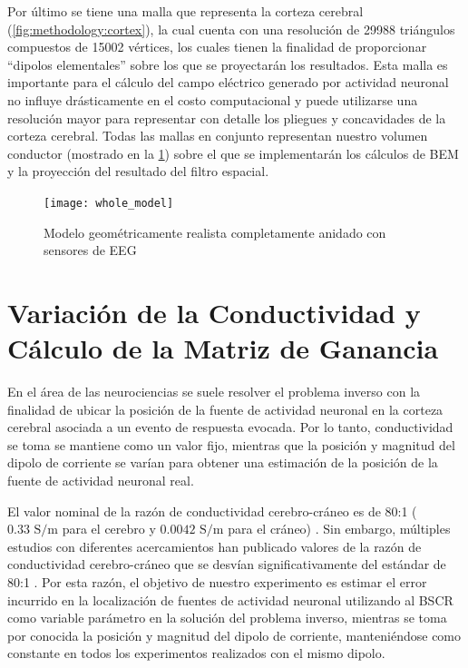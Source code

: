 Por último se tiene una malla que representa la corteza cerebral (\cref{fig:methodology:cortex}), la cual cuenta con una resolución de 29988 triángulos compuestos de 15002 vértices, los cuales tienen la finalidad de proporcionar ``dipolos elementales'' sobre los que se proyectarán los resultados. 
Esta malla es importante para el cálculo del campo eléctrico generado por actividad neuronal no influye drásticamente en el costo computacional y puede utilizarse una resolución mayor para representar con detalle los pliegues y concavidades de la corteza cerebral.
Todas las mallas en conjunto representan nuestro volumen conductor (mostrado en la \cref{fig:methodology:model}) sobre el que se implementarán los cálculos de BEM y la proyección del resultado del filtro espacial.

\begin{figure}[tbp]
	\texttt{[image: whole\_model]}
	\caption{Modelo geométricamente realista completamente anidado con sensores de EEG}
	\label{fig:methodology:model}
\end{figure}

\section{Variación de la Conductividad y Cálculo de la Matriz de Ganancia}
\label{sec:methodology:openmeeg}

En el área de las neurociencias se suele resolver el problema inverso con la finalidad de ubicar la posición de la fuente de actividad neuronal en la corteza cerebral asociada a un evento de respuesta evocada. 
Por lo tanto, 
conductividad se toma  se mantiene como un valor fijo, mientras que la posición y magnitud del dipolo de corriente se varían para obtener una estimación de la posición de la fuente de actividad neuronal real. 

El valor nominal de la razón de conductividad cerebro-cráneo es de 80:1 ($0.33\text{ S/m}$ para el cerebro y $0.0042 \text{ S/m}$ para el cráneo) \cite{Rush1968,Rush1969,Cohen1983}.
Sin embargo, múltiples estudios con diferentes acercamientos han publicado valores de la razón de conductividad cerebro-cráneo que se desvían significativamente del estándar de 80:1 \cite{McCann2019}.
Por esta razón, el objetivo de nuestro experimento es estimar el error incurrido en la localización de fuentes de actividad neuronal utilizando al BSCR como variable parámetro en la solución del problema inverso, mientras se toma por conocida la posición y magnitud del dipolo de corriente, manteniéndose como constante en todos los experimentos realizados con el mismo dipolo.


